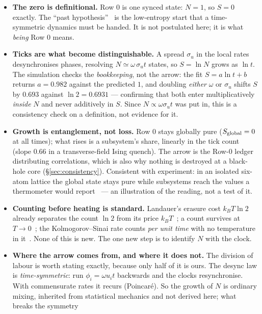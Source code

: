 \documentclass[11pt]{article}
\begin{document}
\begin{itemize}[leftmargin=1.4em,itemsep=2.5pt,topsep=3pt]
\item \textbf{The zero is definitional.} Row 0 is one synced state: $N=1$, so $S=0$ exactly. The ``past hypothesis''~\cite{Albert2000} is the low-entropy start that a time-symmetric dynamics must be handed. It is not postulated here; it is what \emph{being} Row 0 means.
\item \textbf{Ticks are what become distinguishable.} A spread $\sigma_u$ in the local rates desynchronises
  phases, resolving $N\simeq\omega\,\sigma_u t$ states, so $S=\ln N$ grows as $\ln t$. The simulation checks the \emph{bookkeeping}, not the arrow: the fit $S=a\ln t+b$ returns $a=0.982$ against the
  predicted $1$, and doubling \emph{either} $\omega$ or $\sigma_u$ shifts $S$ by $0.693$ against $\ln2=0.6931$
  --- confirming that both enter multiplicatively \emph{inside} $N$ and never additively in $S$. Since
  $N\propto\omega\sigma_u t$ was put in, this is a consistency check on a definition, not evidence for it.
\item \textbf{Growth is entanglement, not loss.} Row 0 stays globally pure ($S_{\rm global}=0$ at all times);
  what rises is a subsystem's share, linearly in the tick count (slope $0.66$ in a transverse-field Ising
  quench). The arrow is the Row-0 ledger distributing correlations, which is also why nothing is destroyed at a
  black-hole core (\S\ref{sec:consistency}). Consistent with experiment: in an isolated six-atom lattice the global state stays pure
  while subsystems reach the values a thermometer would report~\cite{Kaufman2016} --- an illustration of the
  reading, not a test of it.
\item \textbf{Counting before heating is standard.} Landauer's erasure cost $k_BT\ln2$ already separates the
  count $\ln2$ from its price $k_BT$~\cite{Landauer1961,Berut2012}; a count survives at
  $T\to0$~\cite{Pauling1935}; the Kolmogorov--Sinai rate counts \emph{per unit time} with no temperature in
  it~\cite{Pesin1977}. None of this is new. The one new step is to identify $N$ with the clock.
\item \textbf{Where the arrow comes from, and where it does not.} The division of labour is worth stating
  exactly, because only half of it is ours. The desync law is \emph{time-symmetric}: run $\phi_i=\omega u_it$ backwards and the clocks resynchronise. With commensurate rates it recurs (Poincar\'e). So the growth of
  $N$ is ordinary mixing, inherited from statistical mechanics and not derived here; what breaks the symmetry

\end{itemize}
\end{document}
